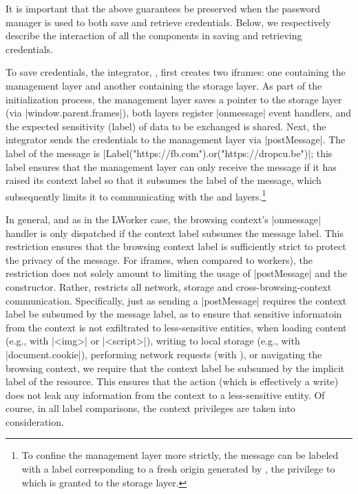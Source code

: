 %
It is important that the above guarantees be preserved when the
password manager is used to both save and retrieve credentials.
%
Below, we respectively describe the interaction of all the components
in saving and retrieving credentials.

%
To save credentials, the integrator, , first creates two
iframes: one containing the  management layer and
another containing the  storage layer.
%
As part of the initialization process, the management layer saves a
pointer to the storage layer (via \js|window.parent.frames|), both
layers register \js|onmessage| event handlers, and the expected
sensitivity (label) of data to be exchanged is shared.
%
Next, the integrator sends the credentials to the management
layer via \js|postMessage|.
%
The label of the message is
\js|Label("https://fb.com").or("https://dropcu.be")|; this label
ensures that the management layer can only receive the message if it
has raised its context label so that it subsumes the label of the
message, which subsequently limits it to communicating with the
 and  layers.\footnote{
  To confine the management layer more strictly, the message can be
  labeled with a label corresponding to a fresh origin generated by
  , the privilege to which is granted to the storage
  layer. 
}

In general, and as in the LWorker case, the browsing context's
\js|onmessage| handler is only dispatched if the context label
subsumes the message label.
%
This restriction ensures that the browsing context label is
sufficiently strict to protect the privacy of the message.
%
For iframes, when compared to workers), the restriction does not
solely amount to limiting the usage of \js|postMessage| and the \xhr{}
constructor.
%
Rather, \sys{} restricts all network, storage and
cross-browsing-context communication.
%
Specifically, just as sending a \js|postMessage| requires the context
label be subsumed by the message label, as to ensure that sensitive
informatoin from the context is not exfiltrated to less-sensitive
entities, when loading content (e.g., with \js|<img>| or
\js|<script>|), writing to local storage (e.g., with
\js|document.cookie|), performing network requests (with
\xhr{}), or navigating the browsing context, we require that the
context label be subsumed by the implicit label of the resource.
%
This ensures that the action (which is effectively a write) does not
leak any information from the context to a less-sensitive entity.
%
Of course, in all label comparisons, the context privileges are taken
into consideration.
%
 
